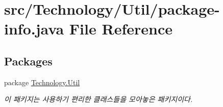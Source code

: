 \hypertarget{_technology_2_util_2package-info_8java}{\section{src/\-Technology/\-Util/package-\/info.java File Reference}
\label{_technology_2_util_2package-info_8java}
}
\subsection*{Packages}
\begin{DoxyCompactItemize}
\item 
package \hyperlink{namespace_technology_1_1_util}{Technology.\-Util}
\begin{DoxyCompactList}\small\item\em 이 패키지는 사용하기 편리한 클래스들을 모아놓은 패키지이다. \end{DoxyCompactList}\end{DoxyCompactItemize}
